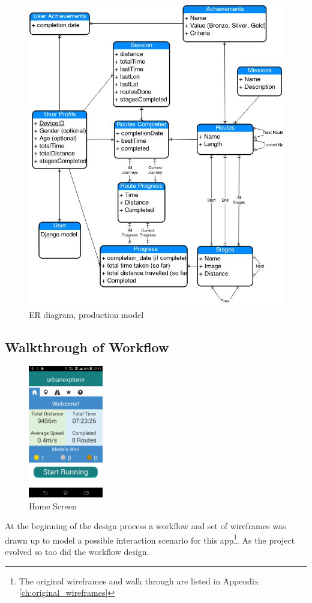 \begin{figure}[p]
  \centering
  \includegraphics[width=\textwidth]{images/ER_prod.jpg}
  \caption{ER diagram, production model}
  \label{ER_2}
\end{figure}


\subsection{Walkthrough of Workflow}
\begin{figure}
  \vspace{-20pt}
  \centering
  \includegraphics[width=0.29\textwidth]{images/screens/home.png}
  \vspace{-20pt}
  \caption{Home Screen}
  \vspace{-110pt}
  \label{fig:home_screen}
\end{figure}
At the beginning of the design process a workflow and set of
wireframes was drawn up to model a possible interaction scenario for 
this app\footnote{The original wireframes and walk through are listed
  in Appendix \ref{ch:original_wireframes}}. As the project evolved so
too did the workflow design. 

